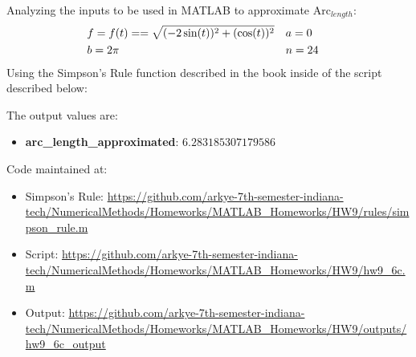 		Analyzing the inputs to be used in MATLAB to approximate Arc$_{length}$:
		\begin{align}
			&f = f(t) = = \sqrt{(-2\sin(t))^{2} + (\cos(t))^{2}}& &a = 0& \notag \\
			&b = 2\pi& &n = 24& \notag
		\end{align}
		Using the Simpson's Rule function described in the book  inside of the script described below:
		\\
		\noindent\makebox[\linewidth]{\rule{\paperwidth/2}{0.4pt}}
		
		\noindent\makebox[\linewidth]{\rule{\paperwidth/2}{0.4pt}}

		The output values are:
		\begin{itemize}
			\item{\textbf{arc\_length\_approximated}: $6.283185307179586$}
		\end{itemize}

		Code maintained at:
		\begin{itemize}
			\item{Simpson's Rule: \url{https://github.com/arkye-7th-semester-indiana-tech/NumericalMethods/Homeworks/MATLAB_Homeworks/HW9/rules/simpson_rule.m}}
			\item{Script: \url{https://github.com/arkye-7th-semester-indiana-tech/NumericalMethods/Homeworks/MATLAB_Homeworks/HW9/hw9_6c.m}}
			\item{Output: \url{https://github.com/arkye-7th-semester-indiana-tech/NumericalMethods/Homeworks/MATLAB_Homeworks/HW9/outputs/hw9_6c_output}}
		\end{itemize}
